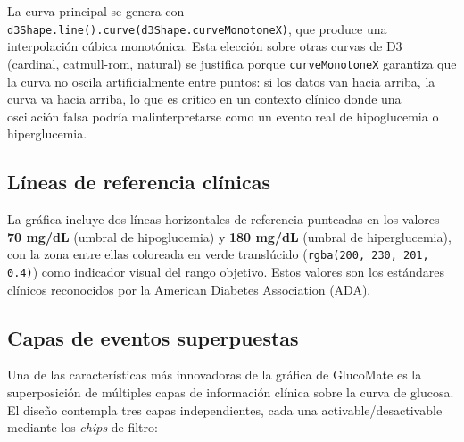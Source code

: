 La curva principal se genera con \texttt{d3Shape.line().curve(d3Shape.curveMonotoneX)},
que produce una interpolación cúbica monotónica. Esta elección sobre otras curvas de D3
(cardinal, catmull-rom, natural) se justifica porque \texttt{curveMonotoneX} garantiza
que la curva no oscila artificialmente entre puntos: si los datos van hacia arriba, la
curva va hacia arriba, lo que es crítico en un contexto clínico donde una oscilación
falsa podría malinterpretarse como un evento real de hipoglucemia o hiperglucemia.

\subsection{Líneas de referencia clínicas}
\label{subsec:lineas-referencia}

La gráfica incluye dos líneas horizontales de referencia punteadas en los valores
\textbf{70 mg/dL} (umbral de hipoglucemia) y \textbf{180 mg/dL} (umbral de
hiperglucemia), con la zona entre ellas coloreada en verde translúcido
(\texttt{rgba(200, 230, 201, 0.4)}) como indicador visual del rango objetivo.
Estos valores son los estándares clínicos reconocidos por la American Diabetes
Association (ADA).

\subsection{Capas de eventos superpuestas}
\label{subsec:capas-eventos}

Una de las características más innovadoras de la gráfica de GlucoMate es la
superposición de múltiples capas de información clínica sobre la curva de glucosa.
El diseño contempla tres capas independientes, cada una activable/desactivable
mediante los \textit{chips} de filtro:

